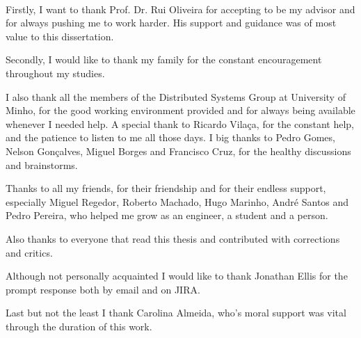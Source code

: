 
\paragraph{}


Firstly, I want to thank Prof. Dr. Rui Oliveira for accepting to be my advisor  and for always pushing me to work harder. His support and guidance was of most value to this dissertation.

Secondly, I would like to thank my family for the constant encouragement throughout my studies.

I also thank all the members of the Distributed Systems Group at University of Minho, for the good working environment provided and for always being available whenever I needed help. A special thank to Ricardo Vilaça, for the constant help, and the patience to listen to me all those days. I big thanks to Pedro Gomes, Nelson Gonçalves, Miguel Borges and Francisco Cruz, for the healthy discussions and brainstorms. 

Thanks to all my friends, for their friendship and for their endless support, especially Miguel Regedor, Roberto Machado, Hugo Marinho, André Santos and Pedro Pereira, who helped me grow as an engineer, a student and a person. 

Also thanks to everyone that read this thesis and contributed with corrections and critics.

Although not personally acquainted I would like to thank Jonathan Ellis for the prompt response both by email and on JIRA.  

Last but not the least I thank Carolina Almeida, who's moral support was vital through the duration of this work. 
 